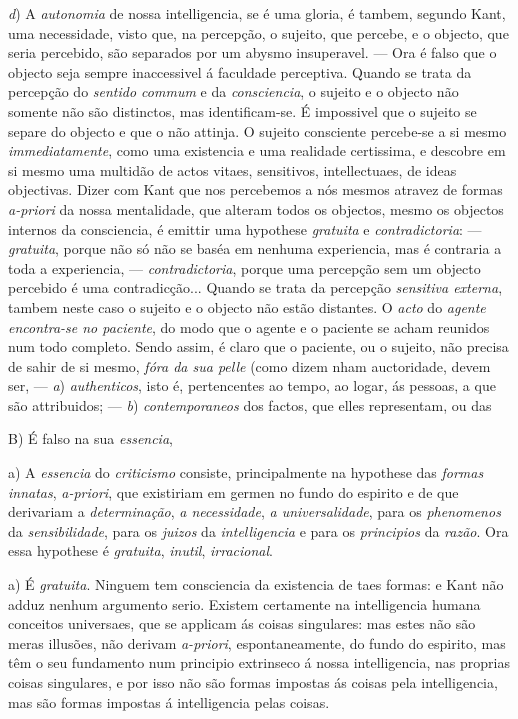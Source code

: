 \emph{d}) A \emph{autonomia} de nossa intelligencia, se é uma gloria, é tambem, segundo Kant, uma necessidade, visto que, na percepção, o sujeito, que percebe, e o objecto, que seria percebido, são separados por um abysmo insuperavel. --- Ora é falso que o objecto seja sempre inaccessivel á faculdade perceptiva. Quando se trata da percepção do \emph{sentido commum} e da \emph{consciencia}, o sujeito e o objecto não somente não são distinctos, mas identificam-se. É impossivel que o sujeito se separe do objecto e que o não attinja. O sujeito consciente percebe-se a si mesmo \emph{immediatamente}, como uma existencia e uma realidade certissima, e descobre em si mesmo uma multidão de actos vitaes, sensitivos, intellectuaes, de ideas objectivas. Dizer com Kant que nos percebemos a nós mesmos atravez de formas \emph{a-priori} da nossa mentalidade, que alteram todos os objectos, mesmo os objectos internos da consciencia, é emittir uma hypothese \emph{gratuita} e \emph{contradictoria}: --- \emph{gratuita}, porque não só não se baséa em nenhuma experiencia, mas é contraria a toda a experiencia, --- \emph{contradictoria}, porque uma percepção sem um objecto percebido é uma contradicção... Quando se trata da percepção \emph{sensitiva externa}, tambem neste caso o sujeito e o objecto não estão distantes. O \emph{acto} do \emph{agente encontra-se no paciente}, do modo que o agente e o paciente se acham reunidos num todo completo. Sendo assim, é claro que o paciente, ou o sujeito, não precisa de sahir de si mesmo, \emph{fóra da sua pelle} (como dizem  nham auctoridade, devem ser, --- \emph{a}) \emph{authenticos}, isto é, pertencentes ao tempo, ao logar, ás pessoas, a que são attribuidos; --- \emph{b}) \emph{contemporaneos} dos factos, que elles representam, ou das

B) É falso na sua \emph{essencia},

a) A \emph{essencia} do \emph{criticismo} consiste, principalmente na hypothese das \emph{formas innatas}, \emph{a-priori}, que existiriam em germen no fundo do espirito e de que derivariam a \emph{determinação}, \emph{a necessidade}, \emph{a universalidade}, para os \emph{phenomenos} da \emph{sensibilidade}, para os \emph{juizos} da \emph{intelligencia} e para os \emph{principios} da \emph{razão}. Ora essa hypothese é \emph{gratuita}, \emph{inutil}, \emph{irracional}.

a) É \emph{gratuita}. Ninguem tem consciencia da existencia de taes formas: e Kant não adduz nenhum argumento serio. Existem certamente na intelligencia humana conceitos universaes, que se applicam ás coisas singulares: mas estes não são meras illusões, não derivam \emph{a-priori}, espontaneamente, do fundo do espirito, mas têm o seu fundamento num principio extrinseco á nossa intelligencia, nas proprias coisas singulares, e por isso não são formas impostas ás coisas pela intelligencia, mas são formas impostas á intelligencia pelas coisas.

